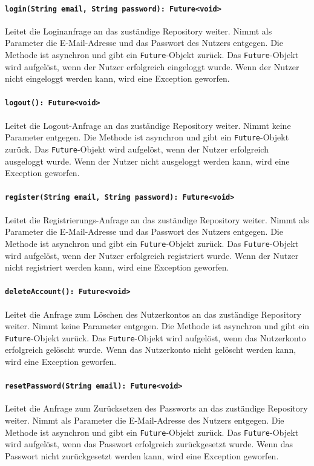 \documentclass[parskip=full]{scrartcl}
\begin{document}
\paragraph{\texttt{login(String email, String password): Future<void>}}
Leitet die Loginanfrage an das zuständige Repository weiter. Nimmt als Parameter die E-Mail-Adresse und das Passwort des Nutzers entgegen. Die Methode ist asynchron und gibt ein \texttt{Future}-Objekt zurück. Das \texttt{Future}-Objekt wird aufgelöst, wenn der Nutzer erfolgreich eingeloggt wurde. Wenn der Nutzer nicht eingeloggt werden kann, wird eine Exception geworfen.
\paragraph{\texttt{logout(): Future<void>}}
Leitet die Logout-Anfrage an das zuständige Repository weiter. Nimmt keine Parameter entgegen. Die Methode ist asynchron und gibt ein \texttt{Future}-Objekt zurück. Das \texttt{Future}-Objekt wird aufgelöst, wenn der Nutzer erfolgreich ausgeloggt wurde. Wenn der Nutzer nicht ausgeloggt werden kann, wird eine Exception geworfen.
\paragraph{\texttt{register(String email, String password): Future<void>}}
Leitet die Registrierungs-Anfrage an das zuständige Repository weiter. Nimmt als Parameter die E-Mail-Adresse und das Passwort des Nutzers entgegen. Die Methode ist asynchron und gibt ein \texttt{Future}-Objekt zurück. Das \texttt{Future}-Objekt wird aufgelöst, wenn der Nutzer erfolgreich registriert wurde. Wenn der Nutzer nicht registriert werden kann, wird eine Exception geworfen.
\paragraph{\texttt{deleteAccount(): Future<void>}}
Leitet die Anfrage zum Löschen des Nutzerkontos an das zuständige Repository weiter. Nimmt keine Parameter entgegen. Die Methode ist asynchron und gibt ein \texttt{Future}-Objekt zurück. Das \texttt{Future}-Objekt wird aufgelöst, wenn das Nutzerkonto erfolgreich gelöscht wurde. Wenn das Nutzerkonto nicht gelöscht werden kann, wird eine Exception geworfen.
\paragraph{\texttt{resetPassword(String email): Future<void>}}
Leitet die Anfrage zum Zurücksetzen des Passworts an das zuständige Repository weiter. Nimmt als Parameter die E-Mail-Adresse des Nutzers entgegen. Die Methode ist asynchron und gibt ein \texttt{Future}-Objekt zurück. Das \texttt{Future}-Objekt wird aufgelöst, wenn das Passwort erfolgreich zurückgesetzt wurde. Wenn das Passwort nicht zurückgesetzt werden kann, wird eine Exception geworfen.
\end{document}
